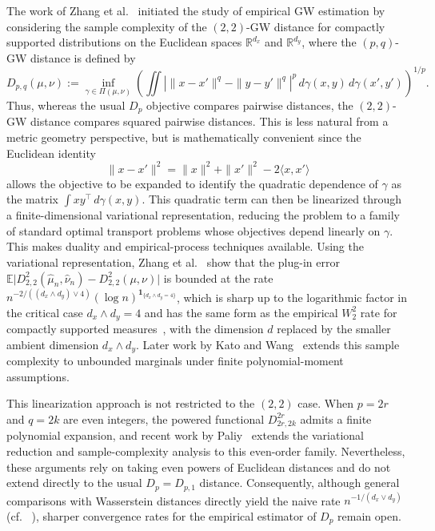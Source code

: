 \documentclass[11pt]{amsart}
\theoremstyle{definition}
\theoremstyle{remark}
\newcommand{\R}{\mathbb{R}}
\newcommand{\E}{\mathbb{E}}
\newcommand{\1}{\mathbf{1}}
\numberwithin{equation}{section}
\begin{document}
The work of Zhang et al.~\cite{zhang2024gromov} initiated the study of empirical GW estimation by considering the sample complexity of the $(2,2)$-GW distance for compactly supported distributions on the Euclidean spaces $\R^{d_x}$ and $\R^{d_y}$, where the $(p,q)$-GW distance is defined by
\[ D_{p,q}(\mu,\nu)
    :=
    \inf_{\gamma \in \Pi(\mu,\nu)}
    \left(
        \iint
        \left|
            \|x-x'\|^q - \|y-y'\|^q
        \right|^p
        \,d\gamma(x,y)\,d\gamma(x',y')
    \right)^{1/p}.\]
Thus, whereas the usual $D_p$ objective compares pairwise distances, the $(2,2)$-GW distance compares squared pairwise distances.  This is less natural from a metric geometry perspective, but is mathematically convenient since the Euclidean identity
\[\|x - x'\|^2 = \|x\|^2 + \|x'\|^2 - 2\langle x,x'\rangle\] 
allows the objective to be expanded to identify the quadratic dependence of $\gamma$ as the matrix $\int xy^\top\,d\gamma(x,y)$. This quadratic term can then be linearized through a finite-dimensional variational representation, reducing the problem to a family of standard optimal transport problems whose objectives depend linearly on $\gamma$. This makes duality and empirical-process techniques available. Using the variational representation, Zhang et al.~\cite[Theorem~4.2]{zhang2024gromov} show that the plug-in error
$\E\bigl|D_{2,2}^2(\widehat\mu_n,\widehat\nu_n)
-D_{2,2}^2(\mu,\nu)\bigr|$
is bounded at the rate
$n^{-2/((d_x\wedge d_y)\vee4)}
(\log n)^{\mathbf 1_{\{d_x\wedge d_y=4\}}}$,
which is sharp up to the logarithmic factor in the critical case $d_x\wedge d_y=4$ and has the same form as the empirical $W_2^2$ rate for compactly supported measures~\cite{fournier2015rate}, with the dimension $d$ replaced by the smaller ambient dimension $d_x\wedge d_y$. Later work by Kato and Wang~\cite{kato2025convergence} extends this sample complexity to unbounded marginals under finite polynomial-moment assumptions.

This linearization approach is not restricted to the $(2,2)$ case. When $p=2r$ and $q=2k$ are even integers, the powered functional $D_{2r,2k}^{2r}$ admits a finite polynomial expansion, and recent work by Paliy~\cite{paliy2026empirical} extends the variational reduction and sample-complexity analysis to this even-order family. Nevertheless, these arguments rely on taking even powers of Euclidean distances and do not extend directly to the usual $D_p=D_{p,1}$ distance. Consequently, although general comparisons with Wasserstein distances directly yield the naive rate $n^{-1/(d_x\vee d_y)}$ (cf. ~\cite[Remark~4.5]{zhang2024gromov}), sharper convergence rates for the empirical estimator of $D_p$ remain open.
\end{document}
